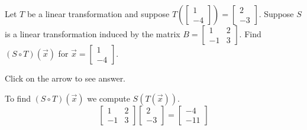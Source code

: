\documentclass{ximera}
\begin{document}
\begin{problem}\label{prb:6.6} Let $T$ be a linear transformation and suppose $T \left( \left[ \begin{array}{r}
1 \\
-4
\end{array} \right] \right) = \left[ \begin{array}{r}
2 \\
-3
\end{array} \right]$. Suppose $S$ is a linear transformation induced by the matrix $B = \left[ \begin{array}{rr}
1 & 2 \\
-1 & 3
\end{array} \right]$. Find $\left( S \circ T \right) \left( \vec{x} \right)$ for $\vec{x} = \left[ \begin{array}{r}
1 \\
-4
\end{array} \right]$.

Click on the arrow to see answer.
\begin{expandable}
To find $\left( S \circ T \right) \left( \vec{x} \right)$ we compute $S(T(\vec{x}))$.
\[
\left[ \begin{array}{rr}
1 & 2 \\
-1 & 3
\end{array} \right]
\left[ \begin{array}{r}
2 \\
-3
\end{array} \right]
 = \left[
\begin{array}{r}
-4 \\
-11
\end{array}
\right]
\]
\end{expandable}
\end{problem}
\end{document}
